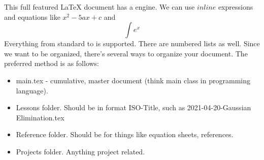 \markdownRendererUlBegin
\markdownRendererUlItem This full featured LaTeX document has a  engine.\markdownRendererUlItemEnd 
\markdownRendererUlItem We can use $inline$ expressions and equations like $x^2-5ax+c$ and $$\int e^x$$\markdownRendererUlItemEnd 
\markdownRendererUlItem Everything from standard  to  is supported.\markdownRendererUlItemEnd 
\markdownRendererUlEnd \markdownRendererInterblockSeparator
{}\markdownRendererOlBeginTight
{}There are numbered lists as well.\markdownRendererOlItemEnd 
\markdownRendererOlEndTight \markdownRendererInterblockSeparator
{}\markdownRendererInterblockSeparator
{}Since we want to be organized, there's several ways to organize your document. The preferred method is as follows:\markdownRendererInterblockSeparator
{}\markdownRendererInterblockSeparator
{}\begin{itemize} \item main.tex - cumulative, master document (think main class in programming language). \item Lessons folder. Should be in format ISO-Title, such as 2021-04-20-Gaussian Elimination.tex \item Reference folder. Should be for things like equation sheets, references. \item Projects folder. Anything project related. \end{itemize}\relax